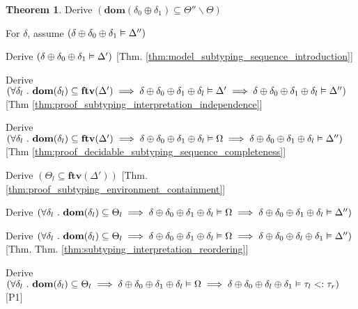 \documentclass[acmsmall]{acmart}
\theoremstyle{definition}
\newtheorem{theorem}{Theorem}[section]
\begin{document}
\begin{theorem}
  \item \I \N Derive $(
    \textbf{dom}(\delta_0 \oplus \delta_1) \subseteq \Theta'' \backslash \Theta
  )$

  \item \I \N For $\delta$, assume $(
    \delta \oplus \delta_0 \oplus \delta_1 \vDash \Delta''
  )$ 

  \item \I\I \N Derive $(
    \delta \oplus \delta_0 \oplus \delta_1 \vDash \Delta'
  )$ [Thm. \ref{thm:model_subtyping_sequence_introduction}]

  \item \I\I \N Derive $(
    \forall \delta_l \ .\ 
    \textbf{dom}(\delta_l) \subseteq \textbf{ftv}(\Delta')
    \implies
    \delta \oplus \delta_0 \oplus \delta_1 \oplus \delta_l \vDash \Delta' 
    \implies
    \delta \oplus \delta_0 \oplus \delta_1 \oplus \delta_l \vDash \Delta''
  )$ [Thm \ref{thm:proof_subtyping_interpretation_independence}]


  \item \I\I \N Derive $(
    \forall \delta_l \ .\ 
    \textbf{dom}(\delta_l) \subseteq \textbf{ftv}(\Delta')
    \implies
    \delta \oplus \delta_0 \oplus \delta_1 \oplus \delta_l \vDash \Omega 
    \implies
    \delta \oplus \delta_0 \oplus \delta_1 \oplus \delta_l \vDash \Delta''
  )$ [Thm \ref{thm:proof_decidable_subtyping_sequence_completeness}]

  \item \I\I \N Derive $(
    \Theta_l \subseteq \textbf{ftv}(\Delta')
  )$ [Thm. \ref{thm:proof_subtyping_environment_containment}]

  \item \I\I \N Derive $(
    \forall \delta_l \ .\ 
    \textbf{dom}(\delta_l) \subseteq \Theta_l 
    \implies
    \delta \oplus \delta_0 \oplus \delta_1 \oplus \delta_l \vDash \Omega
    \implies
    \delta \oplus \delta_0 \oplus \delta_1 \oplus \delta_l \vDash \Delta''
  )$ 

  \item \I\I \N Derive $(
    \forall \delta_l \ .\ 
    \textbf{dom}(\delta_l) \subseteq \Theta_l 
    \implies
    \delta \oplus \delta_0 \oplus \delta_1 \oplus \delta_l \vDash \Omega
    \implies
    \delta \oplus \delta_0 \oplus \delta_l \oplus \delta_1 \vDash \Delta''
  )$ [Thm. Thm. \ref{thm:subtyping_interpretation_reordering}]

  \item \I\I \N Derive $(
    \forall \delta_l \ .\ 
    \textbf{dom}(\delta_l) \subseteq \Theta_l
    \implies
    \delta \oplus \delta_0 \oplus \delta_1 \oplus \delta_l \vDash \Omega
    \implies
    \delta \oplus \delta_0 \oplus \delta_l \oplus \delta_1 \vDash \tau_l <: \tau_r
  )$ [P1] 


\end{theorem}
\end{document}
